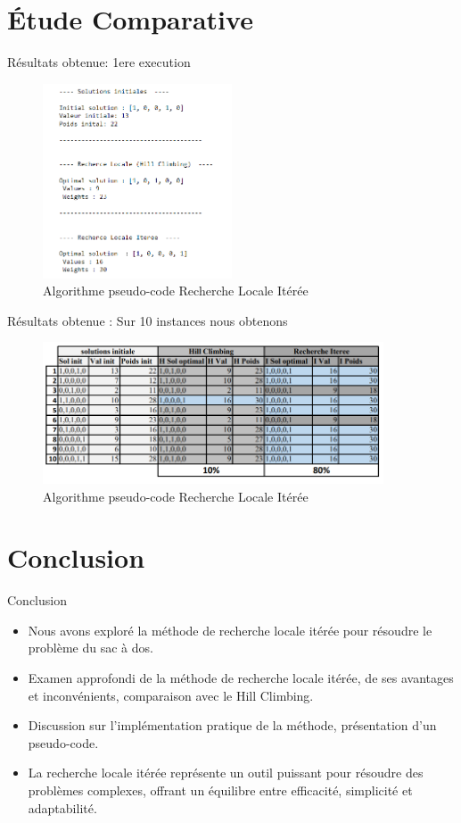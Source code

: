 \documentclass[11pt]{beamer}
\begin{document}
\section{Étude Comparative}
\begin{frame}{Résultats obtenue: 1ere execution}
   \begin{figure}[h]
    \centering
    \includegraphics[width=0.5\textwidth]{solution1.png}
    \caption{Algorithme pseudo-code Recherche Locale Itérée}
    \label{fig:mon_image}
\end{figure}
\end{frame}
\begin{frame}{Résultats obtenue  : Sur 10 instances nous obtenons}
   \begin{figure}[h]
    \centering
    \includegraphics[width=0.9\textwidth]{stat.png}
    \caption{Algorithme pseudo-code Recherche Locale Itérée}
    \label{fig:mon_image}
\end{figure}
\end{frame}

\section{Conclusion}
\begin{frame}{Conclusion}
    \begin{itemize}
\item Nous avons exploré la méthode de recherche locale itérée pour résoudre le problème du sac à dos.
\item Examen approfondi de la méthode de recherche locale itérée, de ses avantages et inconvénients, comparaison avec le Hill Climbing.
\item Discussion sur l'implémentation pratique de la méthode, présentation d'un pseudo-code.
\item La recherche locale itérée représente un outil puissant pour résoudre des problèmes complexes, offrant un équilibre entre efficacité, simplicité et adaptabilité.
\end{itemize}
\end{frame}
\end{document}
